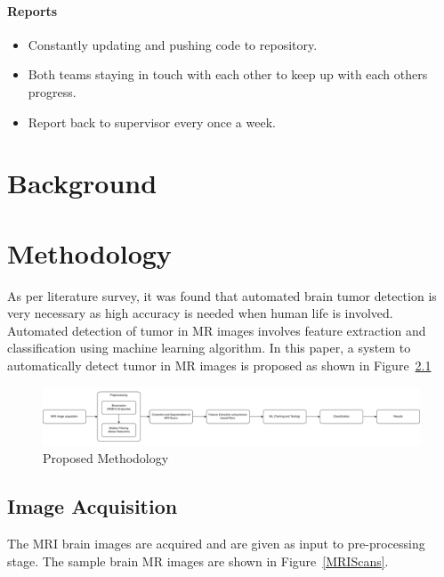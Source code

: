 \documentclass[10pt]{report}
\begin{document}
	\subsubsection[reports]{Reports}
	\begin{itemize}
		\item Constantly updating and pushing code to repository.
		\item Both teams staying in touch with each other to keep up with each
			others progress.
		\item Report back to supervisor every once a week.
	\end{itemize}

	\chapter{Background}
	

	\chapter{Methodology}

	As per literature survey, it was found that automated  brain  tumor
	detection  is  very  necessary  as  high accuracy is needed when human life
	is involved.  Automated detection of tumor in MR images involves feature
	extraction and  classification  using  machine  learning  algorithm.  In
	this paper, a system to automatically detect tumor in MR images is proposed
	as shown in Figure~\ref{Proposed Methodology}

	\begin{figure}[h]
		\centering
		\includegraphics[width=1\linewidth]{imgs/methodology}
		\caption{Proposed Methodology}%
		\label{Proposed Methodology}
	\end{figure}

	\section{Image Acquisition}%

	The MRI brain images are acquired and are
	given as input to pre-processing stage. The sample brain MR images are shown
	in Figure~\ref{MRIScans}.
\end{document}
